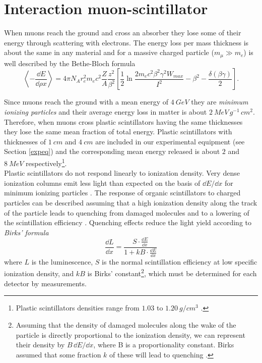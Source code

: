 \section{Interaction muon-scintillator}
\label{Mu-Sci}

When muons reach the ground and cross an absorber they lose some of their energy through scattering with electrons. The energy loss per mass thickness is about the same in any material and for a massive charged particle ($m_{\mu} \gg m_{e}$) is well described by the Bethe-Bloch formula \cite{PDG}
\begin{equation}
\left< - \frac{\dd E}{\dd \rho x} \right> = 4 \pi N_{A} r_{e}^2 m_e c^2  \frac{Z}{A} \frac{z^2}{\beta^2} \left[ \frac{1}{2} \ln \frac{2 m_e c^2 \beta^2 \gamma^2 W_{max}}{I^2} - \beta^2 - \frac{\delta(\beta \gamma)}{2} \right] .
\end{equation}

Since muons reach the ground with a mean energy of $\SI{4}{GeV}$ they are \emph{minimum ionizing particles} and their average energy loss in matter is about $ \SI{2}{MeV} \, \si{g}^{-1} \, \si{cm}^{2}$.    
Therefore, when muons cross plastic scintillators having the same thicknesses they lose the same mean fraction of total energy.
Plastic scintillators with thicknesses of $\SI{1}{cm}$ and $\SI{4}{cm}$ are included in our experimental equipment (see Section \ref{expeq}) and the corresponding mean energy released is about $2$ and $\SI{8}{MeV}$ respectively\footnote{Plastic scintillators densities range from $1.03$ to $\SI{1.20}{g / cm^{3}}$ \cite{PDG}.}.\\

Plastic scintillators do not respond linearly to ionization density. Very dense ionization columns emit less light than expected on the basis of $\dd E / \dd x$ for minimum ionizing particles \cite{PDG}. The response of organic scintillators to charged particles can be described assuming that a high ionization density along the track of the particle leads to quenching from damaged molecules and to a lowering of the scintillation efficiency \cite{Knoll}.
Quenching effects %
reduce the light yield according to \emph{Birks' formula} 
\begin{equation}
\frac{\dd L}{\dd x} = \frac{ S\cdot \displaystyle\frac{\dd E}{\dd x} }{ 1 + k B \cdot\displaystyle \frac{\dd E}{\dd x} } 
\end{equation}
where $L$ is the luminescence, $S$ is the normal scintillation efficiency at low specific ionization density,
and $kB$ is Birks’ constant\footnote{Assuming that the density of damaged molecules along the wake of the particle is directly proportional to the ionization density, we can represent their density by $B \, \dd E / \dd x$, where B is a proportionality constant. Birks assumed that some fraction $k$ of these will lead to quenching \cite{Knoll}.}, which must be determined for each detector by measurements.\\

